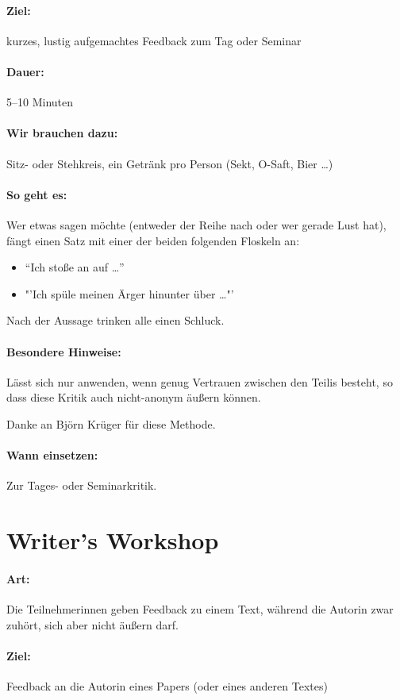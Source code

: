 \paragraph{Ziel:} kurzes, lustig aufgemachtes Feedback zum Tag oder Seminar
\paragraph{Dauer:} 5--10 Minuten
\paragraph{Wir brauchen dazu:} Sitz- oder Stehkreis, ein Getränk pro Person (Sekt, O-Saft, Bier \ldots)
\paragraph{So geht es:} Wer etwas sagen möchte (entweder der Reihe nach oder wer gerade Lust hat), fängt einen Satz mit einer der beiden folgenden Floskeln an:
\begin{itemize}
  \item "`Ich stoße an auf \ldots"'
  \item "'Ich spüle meinen Ärger hinunter über \ldots"'
\end{itemize}
Nach der Aussage trinken alle einen Schluck.

\paragraph{Besondere Hinweise:} Lässt sich nur anwenden, wenn genug Vertrauen zwischen den Teilis besteht, so dass diese Kritik auch nicht-anonym äußern können.

Danke an Björn Krüger für diese Methode.
\paragraph{Wann einsetzen:} Zur Tages- oder Seminarkritik.

\section{Writer's Workshop}
\paragraph{Art:} Die Teilnehmerinnen geben Feedback zu einem Text, während die Autorin zwar zuhört, sich aber nicht äußern darf.
\paragraph{Ziel:} Feedback an die Autorin eines Papers (oder eines anderen Textes)
